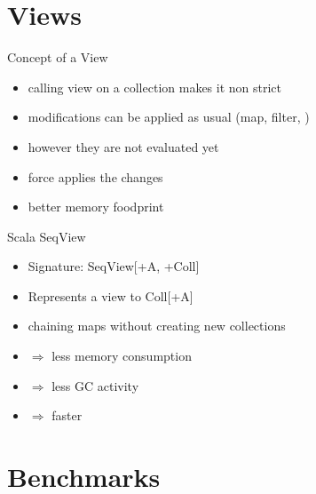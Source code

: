 \documentclass[xcolor=svgnames]{beamer}
\begin{document}
    \section{Views}

    \begin{frame}[fragile]
    {Concept of a View}
        \begin{itemize}
            \item calling view on a collection makes it non strict
            \item modifications can be applied as usual (map, filter, \textellipsis)
            \item however they are not evaluated yet \pause
            \item force applies the changes
            \item better memory foodprint
        \end{itemize}
    \end{frame}

    \begin{frame}[fragile]
    {Scala SeqView}
        \begin{itemize}
            \item Signature: SeqView[+A, +Coll]
            \item Represents a view to Coll[+A]
            \item chaining maps without creating new collections
            \item $\Rightarrow$ less memory consumption \pause
            \item $\Rightarrow$ less GC activity \pause
            \item $\Rightarrow$ faster
        \end{itemize}
    \end{frame}

    \section{Benchmarks}

\end{document}
